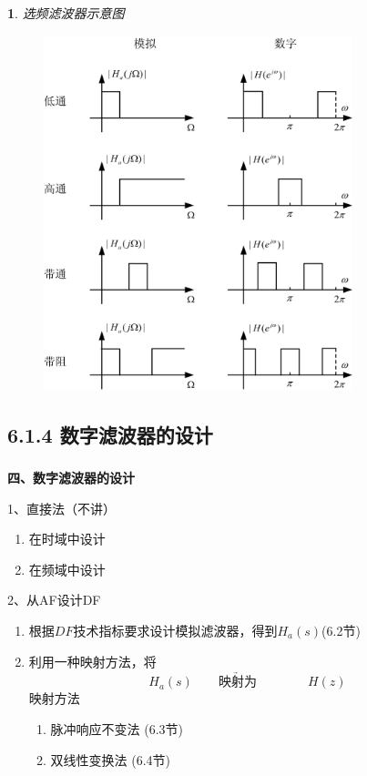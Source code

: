 \documentclass[notheorems,compress,mathserif,table]{beamer}
\newtheorem{dablock}{}
\begin{document}
\begin{frame}[shrink]\frametitle{}%
\begin{dablock}\centering
选频滤波器示意图
\end{dablock}
\begin{figure}[h]
\centering
\includegraphics[width=0.8\textwidth]{fig4dtgtdtdz.jpg}
\end{figure}
\end{frame}
\subsection{6.1.4 数字滤波器的设计}
\begin{frame}\frametitle{}%
\textbf{\heiti 四、数字滤波器的设计}
\newline

1、直接法（不讲）
\begin{enumerate}
\item [(1)] 在时域中设计
\item [(2)] 在频域中设计
\end{enumerate}
2、从AF设计DF
\begin{enumerate}
\item [(1)]  根据$DF$技术指标要求设计模拟滤波器，得到$H_{a}(s)$(6.2节)
\item [(2)] 利用一种映射方法，将    $$H_{a}(s)\underrightarrow{\quad\quad\mbox{映射为}\quad\quad}
{\quad\quad}H(z)$$
映射方法
\begin{enumerate}
\item [(a)] 脉冲响应不变法 \quad (6.3节)
\item [(b)] 双线性变换法  \qquad (6.4节)
\end{enumerate}
\end{enumerate}
\end{frame}
\end{document}
